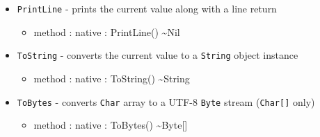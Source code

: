 \documentclass[11pt]{article}
\begin{document}
\begin{itemize}
\item \texttt{PrintLine} - prints the current value along with a line
  return
  \begin{itemize}
  \item method : native : PrintLine() \textasciitilde Nil
  \end{itemize}
\item \texttt{ToString} - converts the current value to a
  \texttt{String} object instance
  \begin{itemize}
  \item method : native : ToString() \textasciitilde String
  \end{itemize}
\item \texttt{ToBytes} - converts \texttt{Char} array to a UTF-8 \texttt{Byte} stream (\texttt{Char[]} only)
  \begin{itemize}
  \item method : native : ToBytes() \textasciitilde Byte[]
  \end{itemize}
\end{itemize}
\end{document}
